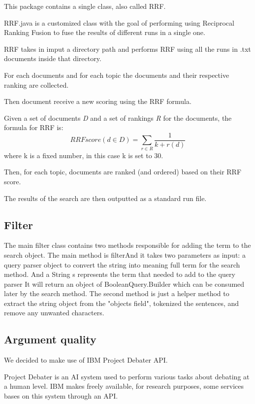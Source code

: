       This package contains a single class, also called RRF.
        
        RRF.java is a customized class with the goal of performing using Reciprocal Ranking Fusion to fuse the results of different runs in a single one.
        
        RRF takes in imput a directory path and performs RRF using all the runs in .txt documents inside that directory.
        
        For each documents and for each topic the documents and their respective ranking are collected.
        
        Then document receive a new scoring using the RRF formula.
        
        Given a set of documents \textit{D} and a set of rankings \textit{R} for the documents, the formula for RRF is:
        $$RRFscore(d \in D)=\sum_{r \in R}^{}\frac{1}{k+r(d)}$$
        where k is a fixed number, in this case k is set to 30.
        
        Then, for each topic, documents are ranked (and ordered) based on their RRF score.
        
        The results of the search are then outputted as a standard run file.
\subsection{Filter}
 
    The main filter class contains two methods responsible for adding the term to the search object. The main method is filterAnd it takes two parameters as input: a query parser object to convert the string into meaning full term for the search method. And a String s represents the term that needed to add to the query parser It will return an object of BooleanQuery.Builder which can be consumed later by the search method. The second method is just a helper method to extract the string object from the "objects field", tokenized the sentences, and remove any unwanted characters.

\subsection{Argument quality}
  \label{subsec:Argument quality}
  We decided to make use of IBM Project Debater API.
  
      Project Debater is an AI system used to perform various tasks about debating at a human level. IBM makes freely available, for research purposes, some services bases on this system through an API. \citep{ProjectDebaterAPI}
      
